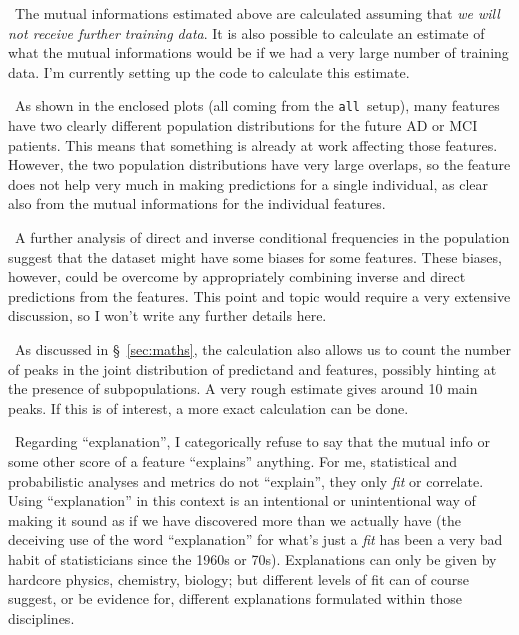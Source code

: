 \documentclass[\ifafour a4paper,12pt,\else a5paper,10pt,\fi%
onecolumn,oneside,article,%
british%
]{memoir}
\theoremstyle{remark}
\theoremstyle{innote}
\renewcommand*{\|}[1][]{\nonscript\:#1\vert\nonscript\:\mathopen{}}
\newcommand*{\sect}{\S}%
\newcommand*{\all}{\texttt{all}}
\begin{document}
\textbullet\ The mutual informations estimated above are calculated assuming that \emph{we
will not receive further training data}. It is also possible to calculate
an estimate of what the mutual informations would be if we had a very large
number of training data. I'm currently setting up the code to calculate
this estimate.

\medskip

\noindent\textbullet\ As shown in the enclosed plots (all coming from the \all\ setup), many
features have two clearly different population distributions for the future
AD or MCI patients. This means that something is already at work affecting
those features. However, the two population distributions have very large
overlaps, so the feature does not help very much in making predictions for
a single individual, as clear also from the mutual informations for the
individual features.

\medskip

\noindent\textbullet\ A further analysis of direct and inverse conditional
frequencies in the population suggest that the dataset might have some
biases for some features. These biases, however, could be overcome by
appropriately combining inverse and direct predictions from the features.
This point and topic would require a very extensive discussion, so I won't
write any further details here.

\medskip

\noindent\textbullet\ As discussed in \sect~\ref{sec:maths}, the calculation also allows us to
count the number of peaks in the joint distribution of predictand and
features, possibly hinting at the presence of subpopulations. A very rough
estimate gives around 10 main peaks. If this is of interest, a more exact
calculation can be done.

\medskip


\noindent\textbullet\ Regarding \enquote{explanation}, I categorically refuse to say that the
mutual info or some other score of a feature \enquote{explains} anything.
For me, statistical and probabilistic analyses and metrics do not
\enquote{explain}, they only \emph{fit} or correlate. Using
\enquote{explanation} in this context is an intentional or unintentional
way of making it sound as if we have discovered more than we actually have
(the deceiving use of the word \enquote{explanation} for what's just a
\emph{fit} has been a very bad habit of statisticians since the 1960s or
70s). Explanations can only be given by hardcore physics, chemistry,
biology; but different levels of fit can of course suggest, or be evidence
for, different explanations formulated within those disciplines.
\end{document}
